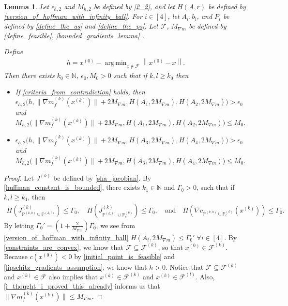 \documentclass{article}
\newtheorem{lemma}[theorem]{Lemma}
\theoremstyle{case}
\numberwithin{theorem}{subsection}
\DeclareMathOperator*{\argmin}{arg\,min}
\newcommand{\feasiblek}{{\mathcal F^{(k)}}}
\newcommand{\feasiblel}{{\mathcal F^{(l)}}}
\newcommand{\feasible}{{\mathcal F}}
\newcommand{\gk}{{\nabla m_f^{(k)}\left(\xk\right)}}
\newcommand{\huff}{{\Gamma_0}}
\newcommand{\naturals}{\mathbb N}
\newcommand{\xk}{x^{(k)}}
\newcommand{\xinit}{{x^{(0)}}}
\newcommand{\trueactiveprojk}{{\mathbb P_c^{(k)}}}
\newcommand{\activeprojkk}{{\mathbb P^{(k, k)}}}
\newcommand{\activeprojkl}{{\mathbb P^{(k, l)}}}
\newcommand{\maxmodelgrad}{{M_{\nabla m}}}
\newcommand{\jackk}{{J^{(k)}}}
\newcommand{\jackkl}{{J^{(k)}_{\activeprojkk \cup \activeprojkl}}}
\newcommand{\jackt}{{J^{(k)}_{\activeprojkk \cup \trueactiveprojk}}}
\begin{document}
\begin{lemma}
\label{its_all_bounded}
Let $\epsilon_{h, 2}$ and $M_{h, 2}$ be defined by \cref{2_2},
and let $H(A, r)$ be defined by \cref{version_of_hoffman_with_infinity_ball}.
For $i \in [4]$, let $A_i, b_i$, and $P_i$ be defined by \cref{define_the_as} and \cref{define_the_ps}.
Let
$\feasible$, $\maxmodelgrad$
be defined by
\cref{define_feasible},
\cref{bounded_gradients_lemma}
.

Define 
\begin{align*}
h = \xinit - \argmin_{x \not \in \feasible} \left\|\xinit - x\right\|.
\end{align*}
Then there exists $k_0 \in \naturals$, $\epsilon_0, M_0 > 0$ such that if $k, l \ge k_0$ then
\begin{itemize}
\item If \cref{criteria_from_contradiction} holds, then
$\epsilon_{h, 2}\big(h, \|\gk\| + 2 \maxmodelgrad, H\left(A_1, 2 \maxmodelgrad\right), H\left(A_2, 2 \maxmodelgrad\right)\big) > \epsilon_0$ \\ and 
         $M_{h, 2} \big(\|\gk\| + 2 \maxmodelgrad, H\left(A_1, 2 \maxmodelgrad\right), H\left(A_2, 2 \maxmodelgrad\right)\big) \le M_0$.
\item
$\epsilon_{h, 2}\big(h, \|\gk\| + 2 \maxmodelgrad, H\left(A_3, 2 \maxmodelgrad\right), H\left(A_4, 2 \maxmodelgrad\right)\big) > \epsilon_0$ \\ and 
		 $M_{h, 2} \big(\|\gk\| + 2 \maxmodelgrad, H\left(A_3, 2 \maxmodelgrad\right), H\left(A_4, 2 \maxmodelgrad\right)\big) \le M_0$.
\end{itemize}
\end{lemma}
\begin{proof}
Let $\jackk$ be defined by \cref{sha_jacobian}.
By \cref{huffman_constant_is_bounded}, there exists $k_1 \in \naturals$ and $\huff > 0$, such that if $k, l \ge k_1$, then 
\begin{align*}
H\left(\jackkl \right) \le \huff,
\quad 
H\left(\jackt\right) \le \huff,
\quad \textrm{and} \quad
H\left(\nabla c_{\activeprojkk \cup \trueactiveprojk }\left(\xk\right)\right) \le \huff.
\end{align*}
By letting $\huff' = \left(1 + \frac 2 {\maxmodelgrad} \right) \huff$, we see from \cref{version_of_hoffman_with_infinity_ball}
$H\left(A_i, 2 \maxmodelgrad\right) \le \huff' \; \forall i \in [4].$
By \cref{constraints_are_convex}, we know that $\feasible \subseteq \feasiblek$, so that $\xinit \in \feasiblek$.
Because $c\left(\xinit\right) < 0$ by \cref{initial_point_is_feasible} and \cref{lipschitz_gradients_assumption}, we know that $h > 0$.
Notice that $\feasible \subseteq \feasiblek$ and $\xk \in \feasible$ also implies that
$\xk \in \feasiblek$ and $\xk \in \feasiblel$.
Also, \cref{i_thought_i_proved_this_already} informs us that $\|\gk\| \le \maxmodelgrad$.

\end{proof}
\end{document}
